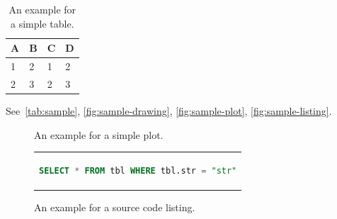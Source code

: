 \begin{table}[htsb]
  \caption[Example table]{An example for a simple table.}\label{tab:sample}
  \centering
  \begin{tabular}{l l l l}
    \toprule
      A & B & C & D \\
    \midrule
      1 & 2 & 1 & 2 \\
      2 & 3 & 2 & 3 \\
    \bottomrule
  \end{tabular}
\end{table}

See~\autoref{tab:sample}, \autoref{fig:sample-drawing}, \autoref{fig:sample-plot}, \autoref{fig:sample-listing}.

\begin{figure}[htsb]
  \centering

  \exampleA
  \exampleB
  \caption[Example plot]{An example for a simple plot.}\label{fig:sample-plot}
\end{figure}

\begin{figure}[htsb]
  \centering
  \begin{tabular}{c}
  \begin{lstlisting}[language=SQL]
    SELECT * FROM tbl WHERE tbl.str = "str"
  \end{lstlisting}
  \end{tabular}
  \caption[Example listing]{An example for a source code listing.}\label{fig:sample-listing}
\end{figure}
